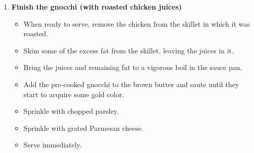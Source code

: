 \documentclass[11pt,letterpaper]{article}
\begin{document}
\begin{description}
\begin{enumerate}
	\item {\bf Finish the gnocchi (with roasted chicken juices)}
	\begin{itemize}
	\item When ready to serve, remove the chicken from the skillet in which it was roasted.
	\item Skim some of the excess fat from the skillet, leaving the juices in it.
	\item Bring the juices and remaining fat to a vigorous boil in the sauce pan.
	\item Add the pre-cooked gnocchi to the brown butter and saute until they start to acquire some gold color.
	\item Sprinkle with chopped parsley.
	\item Sprinkle with grated Parmesan cheese.
	\item Serve immediately.
	\end{itemize}
	\end{enumerate}

\end{description}
\end{document}
